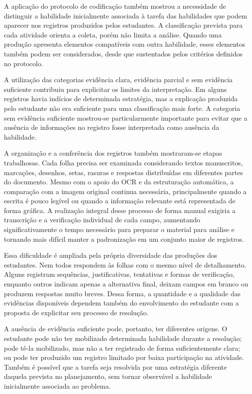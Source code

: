 A aplicação do protocolo de codificação também mostrou a necessidade de distinguir a habilidade inicialmente associada à tarefa das habilidades que podem aparecer nos registros produzidos pelos estudantes. A classificação prevista para cada atividade orienta a coleta, porém não limita a análise. Quando uma produção apresenta elementos compatíveis com outra habilidade, esses elementos também podem ser considerados, desde que sustentados pelos critérios definidos no protocolo.

A utilização das categorias evidência clara, evidência parcial e sem evidência suficiente contribuiu para explicitar os limites da interpretação. Em alguns registros havia indícios de determinada estratégia, mas a explicação produzida pelo estudante não era suficiente para uma classificação mais forte. A categoria sem evidência suficiente mostrou-se particularmente importante para evitar que a ausência de informações no registro fosse interpretada como ausência da habilidade.

A organização e a conferência dos registros também mostraram-se etapas trabalhosas. Cada folha precisa ser examinada considerando textos manuscritos, marcações, desenhos, setas, rasuras e respostas distribuídas em diferentes partes do documento. Mesmo com o apoio do OCR e da estruturação automática, a comparação com a imagem original continua necessária, principalmente quando a escrita é pouco legível ou quando a informação relevante está representada de forma gráfica. A realização integral desse processo de forma manual exigiria a transcrição e a verificação individual de cada campo, aumentando significativamente o tempo necessário para preparar o material para análise e tornando mais difícil manter a padronização em um conjunto maior de registros.

Essa dificuldade é ampliada pela própria diversidade das produções dos estudantes. Nem todos respondem às folhas com o mesmo nível de detalhamento. Alguns registram sequências, justificativas, tentativas e formas de verificação, enquanto outros indicam apenas a alternativa final, deixam campos em branco ou produzem respostas muito breves. Dessa forma, a quantidade e a qualidade das evidências disponíveis dependem também do envolvimento do estudante com a proposta de explicitar seu processo de resolução.

A ausência de evidência suficiente pode, portanto, ter diferentes origens. O estudante pode não ter mobilizado determinada habilidade durante a resolução; pode tê-la mobilizado, mas não a ter registrado de forma suficientemente clara; ou pode ter produzido um registro limitado por baixa participação na atividade. Também é possível que a tarefa seja resolvida por uma estratégia diferente daquela prevista no planejamento, sem tornar observável a habilidade inicialmente associada ao problema.

